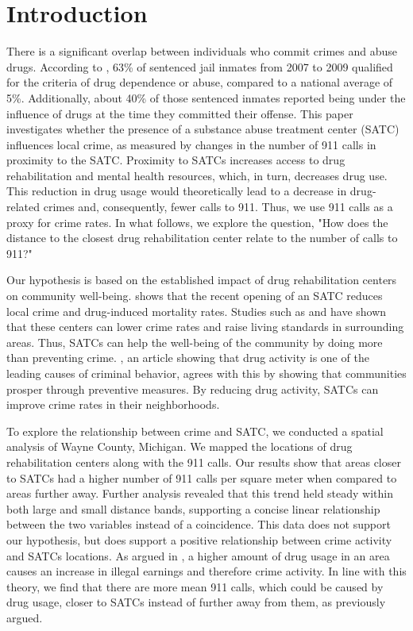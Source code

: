 \documentclass[12pt]{article}
\begin{document}
\section{Introduction} \label{sec:introduction}
There is a significant overlap between individuals who commit crimes and abuse drugs. According to \cite{drug_abuse_inmates}, 63\% of sentenced jail inmates from 2007 to 2009 qualified for the criteria of drug dependence or abuse, compared to a national average of 5\%. Additionally, about 40\% of those sentenced inmates reported being under the influence of drugs at the time they committed their offense. This paper investigates whether the presence of a substance abuse treatment center (SATC) influences local crime, as measured by changes in the number of 911 calls in proximity to the SATC. Proximity to SATCs increases access to drug rehabilitation and mental health resources, which, in turn, decreases drug use. This reduction in drug usage would theoretically lead to a decrease in drug-related crimes and, consequently, fewer calls to 911.  Thus, we use 911 calls as a proxy for crime rates. In what follows, we explore the question, "How does the distance to the closest drug rehabilitation center relate to the number of calls to 911?" 

Our hypothesis is based on the established impact of drug rehabilitation centers on community well-being. \cite{SAT_centers_and_crime} shows that the recent opening of an SATC reduces local crime and drug-induced mortality rates. Studies such as \cite{drugs_and_crime}
and \cite{mental_healthcare_and_crime}  have shown that these centers can lower crime rates and raise living standards in surrounding areas. Thus, SATCs can help the well-being of the community by doing more than preventing crime. \cite{drugs_crime_space_time}, an article showing that drug activity is one of the leading causes of criminal behavior, agrees with this by showing that communities prosper through preventive measures. By reducing drug activity, SATCs can improve crime rates in their neighborhoods. 

To explore the relationship between crime and SATC, we conducted a spatial analysis of Wayne County, Michigan. We mapped the locations of drug rehabilitation centers along with the 911 calls. Our results show that areas closer to SATCs had a higher number of 911 calls per square meter when compared to areas further away. Further analysis revealed that this trend held steady within both large and small distance bands, supporting a concise linear relationship between the two variables instead of a coincidence. This data does not support our hypothesis, but does support a positive relationship between crime activity and SATCs locations. As argued in \cite{Socioeconomic-Determinants}, a higher amount of drug usage in an area causes an increase in illegal earnings and therefore crime activity. In line with this theory, we find that there are more mean 911 calls, which could be caused by drug usage, closer to SATCs instead of further away from them, as previously argued. 
\end{document}
